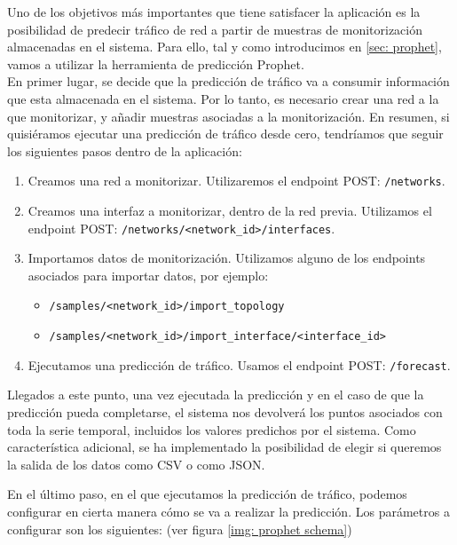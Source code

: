 \documentclass[a4paper, oneside, 12pt]{book}
\begin{document}
	\noindent Uno de los objetivos más importantes que tiene satisfacer la aplicación es la posibilidad de predecir tráfico de red a partir de muestras de monitorización almacenadas en el sistema. Para ello, tal y como introducimos en \ref{sec: prophet}, vamos a utilizar la herramienta de predicción Prophet. \\
	
	\noindent En primer lugar, se decide que la predicción de tráfico va a consumir información que esta almacenada en el sistema. Por lo tanto, es necesario crear una red a la que monitorizar, y añadir muestras asociadas a la monitorización. En resumen, si quisiéramos ejecutar una predicción de tráfico desde cero, tendríamos que seguir los siguientes pasos dentro de la aplicación:
	
	\begin{enumerate}
		\item Creamos una red a monitorizar. Utilizaremos el endpoint POST: \texttt{/networks}.
		
		\item Creamos una interfaz a monitorizar, dentro de la red previa. Utilizamos el endpoint POST: \texttt{/networks/<network\_id>/interfaces}.
		
		\item Importamos datos de monitorización. Utilizamos alguno de los endpoints asociados para importar datos, por ejemplo: 
		\begin{itemize}
			\item \texttt{/samples/<network\_id>/import\_topology}
			
			\item \texttt{/samples/<network\_id>/import\_interface/<interface\_id>}
		\end{itemize}
	
		\item Ejecutamos una predicción de tráfico. Usamos el endpoint POST: \texttt{/forecast}.
	\end{enumerate}

	\noindent Llegados a este punto, una vez ejecutada la predicción y en el caso de que la predicción pueda completarse, el sistema nos devolverá los puntos asociados con toda la serie temporal, incluidos los valores predichos por el sistema. Como característica adicional, se ha implementado la posibilidad de elegir si queremos la salida de los datos como CSV o como JSON.

	\pagebreak

	\noindent En el último paso, en el que ejecutamos la predicción de tráfico, podemos configurar en cierta manera cómo se va a realizar la predicción. Los parámetros a configurar son los siguientes: (ver figura \ref{img: prophet schema})
	
\end{document}
